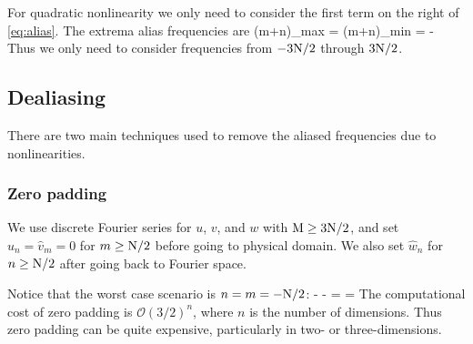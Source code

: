 \documentclass[11pt]{article}
\begin{document}
For quadratic nonlinearity we only need to consider the first term on the right of \eqref{eq:alias}. The extrema alias frequencies are
\beq
(m+n)_{max} = \com\qqand (m+n)_{min} = -\nmax\per
\eeq
Thus we only need to consider frequencies from $-3\mathrm{N}/2$ through $3\mathrm{N}/2$. 

\subsection*{Dealiasing}
There are two main techniques used to remove the aliased frequencies due to nonlinearities. 

\subsubsection*{Zero padding}
We use discrete Fourier series for $u$, $v$, and $w$ with $\mathrm{M}\ge 3\mathrm{N}/2$, and set $\hat{u}_n = \hat{v}_m = 0$ for $m\ge\mathrm{N}/2$ before going to physical domain. We also set $\hat{w}_n$ for $n\ge \mathrm{N}/2$ 
 after going back to Fourier space.

Notice that the worst case scenario is $n=m=-\mathrm{N}/2$:
\beq
- - =  \pm {} \Rightarrow {} = \nmax\per
\eeq
The computational cost of zero padding is $\mathcal{O}(3/2)^n$, where $n$ is the number of dimensions. Thus zero padding can be quite expensive, particularly in two- or three-dimensions. 
\end{document}
